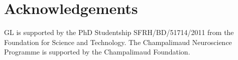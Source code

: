 \section{Acknowledgements}

GL is supported by the PhD Studentship SFRH/BD/51714/2011 from the Foundation for Science and Technology. The Champalimaud Neuroscience Programme is supported by the Champalimaud Foundation.